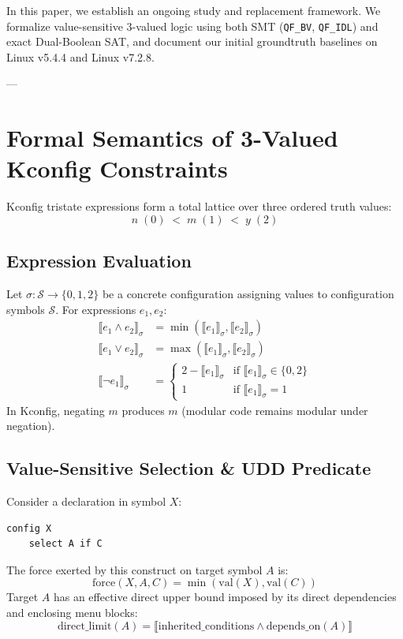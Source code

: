 \documentclass[acmsmall,screen,review,nonacm]{acmart}
\begin{document}
In this paper, we establish an ongoing study and replacement framework. We formalize value-sensitive 3-valued logic using both SMT (\texttt{QF\_BV}, \texttt{QF\_IDL}) and exact Dual-Boolean SAT, and document our initial groundtruth baselines on Linux v5.4.4 and Linux v7.2.8.

---

\section{Formal Semantics of 3-Valued Kconfig Constraints}
\label{sec:semantics}

Kconfig tristate expressions form a total lattice over three ordered truth values:
\begin{equation}
n \;(0) \;<\; m \;(1) \;<\; y \;(2)
\end{equation}

\subsection{Expression Evaluation}
Let $\sigma : \mathcal{S} \to \{0, 1, 2\}$ be a concrete configuration assigning values to configuration symbols $\mathcal{S}$. For expressions $e_1, e_2$:
\begin{align}
\llbracket e_1 \land e_2 \rrbracket_\sigma &= \min(\llbracket e_1 \rrbracket_\sigma, \llbracket e_2 \rrbracket_\sigma) \\
\llbracket e_1 \lor e_2 \rrbracket_\sigma &= \max(\llbracket e_1 \rrbracket_\sigma, \llbracket e_2 \rrbracket_\sigma) \\
\llbracket \neg e_1 \rrbracket_\sigma &= \begin{cases}
2 - \llbracket e_1 \rrbracket_\sigma & \text{if } \llbracket e_1 \rrbracket_\sigma \in \{0, 2\} \\
1 & \text{if } \llbracket e_1 \rrbracket_\sigma = 1
\end{cases}
\end{align}
In Kconfig, negating $m$ produces $m$ (modular code remains modular under negation).

\subsection{Value-Sensitive Selection \& UDD Predicate}
Consider a declaration in symbol $X$:
\begin{lstlisting}[numbers=none]
config X
    select A if C
\end{lstlisting}
The force exerted by this construct on target symbol $A$ is:
\begin{equation}
\text{force}(X, A, C) = \min(\text{val}(X), \text{val}(C))
\end{equation}
Target $A$ has an effective direct upper bound imposed by its direct dependencies and enclosing menu blocks:
\begin{equation}
\text{direct\_limit}(A) = \llbracket \text{inherited\_conditions} \land \text{depends\_on}(A) \rrbracket
\end{equation}
\end{document}
